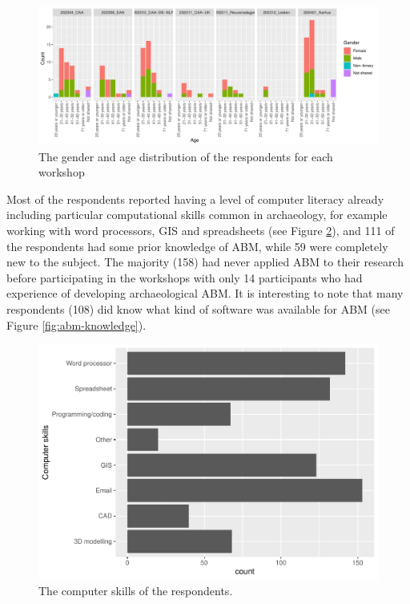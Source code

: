 \documentclass[
]{article}
\begin{document}
\begin{figure}
\centering
\includegraphics{paper_files/figure-latex/gender-age-1.pdf}
\caption{\label{fig:gender-age}The gender and age distribution of the respondents for each workshop}
\end{figure}

Most of the respondents reported having a level of computer literacy already including particular computational skills common in archaeology, for example working with word processors, GIS and spreadsheets (see Figure \ref{fig:computer-skills}), and 111 of the respondents had some prior knowledge of ABM, while 59 were completely new to the subject. The majority (158) had never applied ABM to their research before participating in the workshops with only 14 participants who had experience of developing archaeological ABM. It is interesting to note that many respondents (108) did know what kind of software was available for ABM (see Figure \ref{fig:abm-knowledge}).

\begin{figure}
\includegraphics[width=0.5\linewidth]{paper_files/figure-latex/computer-skills-1} \caption{The computer skills of the respondents.}\label{fig:computer-skills}
\end{figure}
\end{document}

